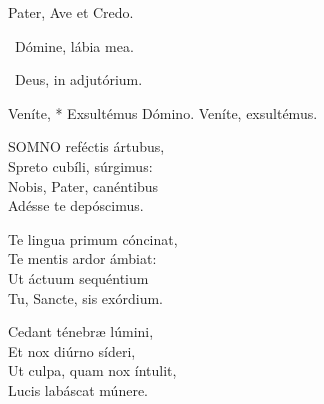 

Pater, Ave et Credo.

\V\ Dómine, lábia mea.

\V\ Deus, in adjutórium.



 Veníte, * Exsultémus Dómino.  Veníte, exsultémus.



\lettrine[lines=2]{S}{OMNO} reféctis ártubus,\\
Spreto cubíli, súrgimus:\\
Nobis, Pater, canéntibus\\
Adésse te depóscimus.

Te lingua primum cóncinat,\\
Te mentis ardor ámbiat:\\
Ut áctuum sequéntium\\
Tu, Sancte, sis exórdium.

Cedant ténebræ lúmini,\\
Et nox diúrno síderi,\\
Ut culpa, quam nox íntulit,\\
Lucis labáscat múnere.

